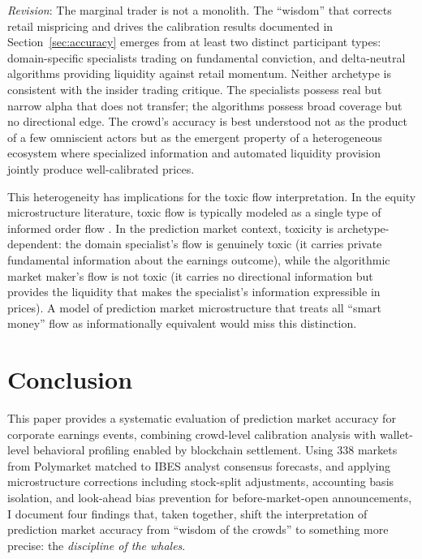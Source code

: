 \documentclass[11pt]{article}
\begin{document}
\textit{Revision}: The marginal trader is not a monolith. The ``wisdom'' that corrects retail mispricing and drives the calibration results documented in Section~\ref{sec:accuracy} emerges from at least two distinct participant types: domain-specific specialists trading on fundamental conviction, and delta-neutral algorithms providing liquidity against retail momentum. Neither archetype is consistent with the insider trading critique. The specialists possess real but narrow alpha that does not transfer; the algorithms possess broad coverage but no directional edge. The crowd's accuracy is best understood not as the product of a few omniscient actors but as the emergent property of a heterogeneous ecosystem where specialized information and automated liquidity provision jointly produce well-calibrated prices.

This heterogeneity has implications for the toxic flow interpretation. In the equity microstructure literature, toxic flow is typically modeled as a single type of informed order flow \citep{easley2012flow}. In the prediction market context, toxicity is archetype-dependent: the domain specialist's flow is genuinely toxic (it carries private fundamental information about the earnings outcome), while the algorithmic market maker's flow is not toxic (it carries no directional information but provides the liquidity that makes the specialist's information expressible in prices). A model of prediction market microstructure that treats all ``smart money'' flow as informationally equivalent would miss this distinction.

\section{Conclusion} \label{sec:conclusion}

This paper provides a systematic evaluation of prediction market accuracy for corporate earnings events, combining crowd-level calibration analysis with wallet-level behavioral profiling enabled by blockchain settlement. Using 338 markets from Polymarket matched to IBES analyst consensus forecasts, and applying microstructure corrections including stock-split adjustments, accounting basis isolation, and look-ahead bias prevention for before-market-open announcements, I document four findings that, taken together, shift the interpretation of prediction market accuracy from ``wisdom of the crowds'' to something more precise: the \textit{discipline of the whales}.
\end{document}
